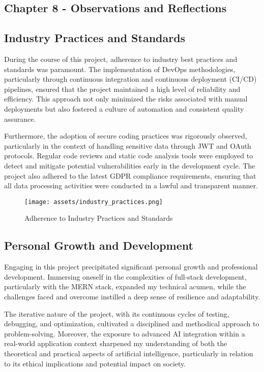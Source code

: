 \subsection{Chapter 8 - Observations and Reflections}

\subsection{Industry Practices and Standards}
During the course of this project, adherence to industry best practices and standards was paramount. The implementation of \gls{DevOps} methodologies, particularly through continuous integration and continuous deployment (CI/CD) pipelines, ensured that the project maintained a high level of reliability and efficiency. This approach not only minimized the risks associated with manual deployments but also fostered a culture of automation and consistent quality assurance.

Furthermore, the adoption of secure coding practices was rigorously observed, particularly in the context of handling sensitive data through \gls{JWT} and \gls{OAuth} protocols. Regular code reviews and static code analysis tools were employed to detect and mitigate potential vulnerabilities early in the development cycle. The project also adhered to the latest \gls{GDPR} compliance requirements, ensuring that all data processing activities were conducted in a lawful and transparent manner.

\begin{figure}[h]
    \centering
    \texttt{[image: assets/industry\_practices.png]}
    \caption{Adherence to Industry Practices and Standards}
    \label{fig:industry_practices}
\end{figure}

\subsection{Personal Growth and Development}
Engaging in this project precipitated significant personal growth and professional development. Immersing oneself in the complexities of full-stack development, particularly with the \gls{MERN} stack, expanded my technical acumen, while the challenges faced and overcome instilled a deep sense of resilience and adaptability.

The iterative nature of the project, with its continuous cycles of testing, debugging, and optimization, cultivated a disciplined and methodical approach to problem-solving. Moreover, the exposure to advanced \gls{AI} integration within a real-world application context sharpened my understanding of both the theoretical and practical aspects of artificial intelligence, particularly in relation to its ethical implications and potential impact on society.

